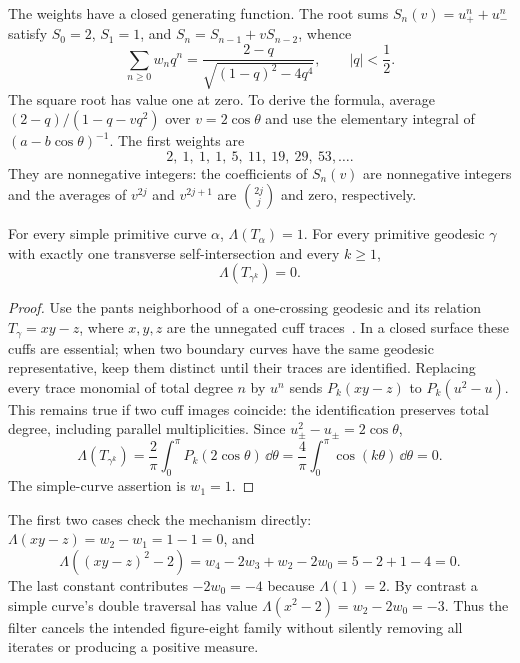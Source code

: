 The weights have a closed generating function. The root sums
$S_n(v)=u_+^n+u_-^n$ satisfy
$S_0=2$, $S_1=1$, and $S_n=S_{n-1}+vS_{n-2}$, whence
\begin{equation}
 \boxed{\quad
 \sum_{n\geq0}w_n q^n
 =\frac{2-q}{\sqrt{(1-q)^2-4q^4}},
 \qquad |q|<\frac12.
 \quad}
 \label{eq:globalweightseries}
\end{equation}
The square root has value one at zero. To derive the formula,
average $(2-q)/(1-q-vq^2)$ over $v=2\cos\theta$ and use the
elementary integral of $(a-b\cos\theta)^{-1}$.
The first weights are
\[
 2,\ 1,\ 1,\ 1,\ 5,\ 11,\ 19,\ 29,\ 53,\ldots.
\]
They are nonnegative integers: the coefficients of $S_n(v)$ are
nonnegative integers and the averages of $v^{2j}$ and $v^{2j+1}$
are $\binom{2j}{j}$ and zero, respectively.

\begin{proposition}
\label{prop:globalonecrossing}
For every simple primitive curve $\alpha$,
$\Lambda(T_\alpha)=1$. For every primitive geodesic $\gamma$
with exactly one transverse self-intersection and every $k\geq1$,
\begin{equation}
 \boxed{\Lambda(T_{\gamma^k})=0.}
 \label{eq:globalonecrossing}
\end{equation}
\end{proposition}

\begin{proof}
Use the pants neighborhood of a one-crossing geodesic and its
relation $T_\gamma=xy-z$, where $x,y,z$ are the unnegated cuff
traces~\cite[Theorem 1.1]{RivinFigures}. In a closed surface these
cuffs are essential; when two boundary curves have the same
geodesic representative, keep them distinct until their traces
are identified. Replacing every trace monomial of total
degree $n$ by $u^n$ sends $P_k(xy-z)$ to $P_k(u^2-u)$.
This remains true if two cuff images coincide: the identification
preserves total degree, including parallel multiplicities. Since
$u_\pm^2-u_\pm=2\cos\theta$,
\[
 \Lambda(T_{\gamma^k})
 =\frac2\pi\int_0^\pi P_k(2\cos\theta)\,\dd\theta
 =\frac4\pi\int_0^\pi\cos(k\theta)\,\dd\theta=0.
\]
The simple-curve assertion is $w_1=1$.
\end{proof}

The first two cases check the mechanism directly:
$\Lambda(xy-z)=w_2-w_1=1-1=0$, and
\[
 \Lambda((xy-z)^2-2)=w_4-2w_3+w_2-2w_0
                  =5-2+1-4=0.
\]
The last constant contributes $-2w_0=-4$ because
$\Lambda(1)=2$. By contrast a simple curve's double traversal
has value $\Lambda(x^2-2)=w_2-2w_0=-3$.
Thus the filter cancels the intended figure-eight family without
silently removing all iterates or producing a positive measure.

